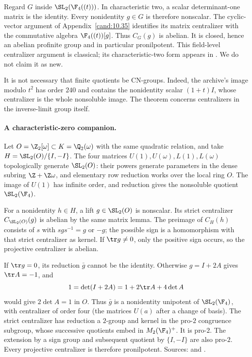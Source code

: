 Regard \(G\) inside \(\SL_2(\F_4((t)))\). In characteristic
two, a scalar determinant-one matrix is the identity.
Every nonidentity \(g\in G\) is therefore nonscalar.
The cyclic-vector argument of Appendix~\ref{cand:10.35}
identifies its matrix centralizer with the commutative algebra
\(\F_4((t))[g]\). Thus \(C_G(g)\) is abelian.
It is closed, hence an abelian profinite group and in
particular pronilpotent. This field-level centralizer
argument is classical; its characteristic-two form appears
in \cite{fine-ct}. We do not claim it as new.

It is not necessary that finite quotients be CN-groups.
Indeed, the archive's image modulo \(t^2\) has order \(240\)
and contains the nonidentity scalar \((1+t)I\), whose
centralizer is the whole nonsoluble image. The theorem
concerns centralizers in the inverse-limit group itself.

\paragraph{A characteristic-zero companion.}
Let \(O=\Z_2[\omega]\subset K=\Q_2(\omega)\) with the same
quadratic relation, and take
\(H=\SL_2(O)/\{I,-I\}\).
The four matrices \(U(1),U(\omega),L(1),L(\omega)\)
topologically generate \(\SL_2(O)\): their powers generate
parameters in the dense subring \(\Z+\Z\omega\), and
elementary row reduction works over the local ring \(O\).
The image of \(U(1)\) has infinite order, and reduction
gives the nonsoluble quotient \(\SL_2(\F_4)\).

For a nonidentity \(h\in H\), a lift \(g\in\SL_2(O)\)
is nonscalar. Its strict centralizer \(C_{\SL_2(O)}(g)\)
is abelian by the same matrix lemma. The preimage of
\(C_H(h)\) consists of \(s\) with \(sgs^{-1}=g\) or \(-g\);
the possible sign is a homomorphism with that strict
centralizer as kernel. If \(\tr g\ne0\), only the
positive sign occurs, so the projective centralizer is
abelian.

If \(\tr g=0\), its reduction \(\bar g\) cannot be the
identity. Otherwise \(g=I+2A\) gives \(\tr A=-1\), and
\[
 1=\det(I+2A)=1+2\tr A+4\det A
\]
would give \(2\det A=1\) in \(O\).
Thus \(\bar g\) is a nonidentity unipotent of
\(\SL_2(\F_4)\), with centralizer of order four
(the matrices \(U(a)\) after a change of basis).
The strict centralizer has reduction a \(2\)-group and
kernel in the pro-\(2\) congruence subgroup, whose
successive quotients embed in \(M_2(\F_4)^+\).
It is pro-\(2\). The extension by a sign group and
subsequent quotient by \(\{I,-I\}\) are also pro-\(2\).
Every projective centralizer is therefore pronilpotent.
Sources:  and
.

